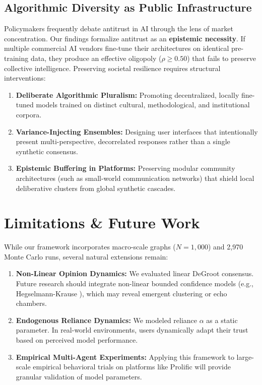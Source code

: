 \documentclass[10pt,twocolumn]{article}
\begin{document}
\subsection{Algorithmic Diversity as Public Infrastructure}
Policymakers frequently debate antitrust in AI through the lens of market concentration. Our findings formalize antitrust as an \textbf{epistemic necessity}. If multiple commercial AI vendors fine-tune their architectures on identical pre-training data, they produce an effective oligopoly ($\rho \ge 0.50$) that fails to preserve collective intelligence. Preserving societal resilience requires structural interventions:
\begin{enumerate}
    \item \textbf{Deliberate Algorithmic Pluralism:} Promoting decentralized, locally fine-tuned models trained on distinct cultural, methodological, and institutional corpora.
    \item \textbf{Variance-Injecting Ensembles:} Designing user interfaces that intentionally present multi-perspective, decorrelated responses rather than a single synthetic consensus.
    \item \textbf{Epistemic Buffering in Platforms:} Preserving modular community architectures (such as small-world communication networks) that shield local deliberative clusters from global synthetic cascades.
\end{enumerate}

\section{Limitations \& Future Work}
While our framework incorporates macro-scale graphs ($N = 1,000$) and 2,970 Monte Carlo runs, several natural extensions remain:
\begin{enumerate}
    \item \textbf{Non-Linear Opinion Dynamics:} We evaluated linear DeGroot consensus. Future research should integrate non-linear bounded confidence models (e.g., Hegselmann-Krause \cite{hegselmann2002opinion}), which may reveal emergent clustering or echo chambers.
    \item \textbf{Endogenous Reliance Dynamics:} We modeled reliance $\alpha$ as a static parameter. In real-world environments, users dynamically adapt their trust based on perceived model performance.
    \item \textbf{Empirical Multi-Agent Experiments:} Applying this framework to large-scale empirical behavioral trials on platforms like Prolific will provide granular validation of model parameters.
\end{enumerate}
\end{document}
